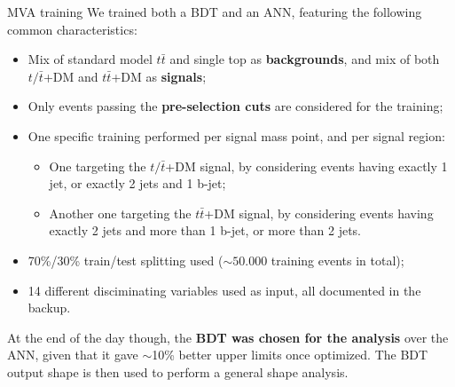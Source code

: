 \documentclass[8pt]{beamer}
\begin{document}
\begin{frame}{MVA training}
\justifying
We \alert{trained both a BDT and an ANN}, featuring the following common characteristics:
\vspace{-5pt}
\begin{itemize}
\justifying
\item Mix of standard model $t \bar t$ and single top as \textbf{backgrounds}, and mix of both $t/\bar t$+DM and $t \bar t$+DM as \textbf{signals};
\item Only events passing the \textbf{pre-selection cuts} are considered for the training;
\item One specific training performed per signal mass point, and per signal region:
\begin{itemize}
\item One targeting the $t/\bar t$+DM signal, by considering events having exactly 1 jet, or exactly 2 jets and 1 b-jet;
\item Another one targeting the $t \bar t$+DM signal, by considering events having exactly 2 jets and more than 1 b-jet, or more than 2 jets.
\end{itemize}

\item 70\%/30\% train/test splitting used ($\sim 50.000$ training events in total);
\item 14 different disciminating variables used as input, all documented in the backup.
\end{itemize} \vfill

At the end of the day though, the \textbf{BDT was chosen for the analysis} over the ANN, given that it gave $\sim$10\% better upper limits once optimized. The BDT output shape is then used to perform a general \alert{shape analysis}. \vfill
\end{frame}
\end{document}
